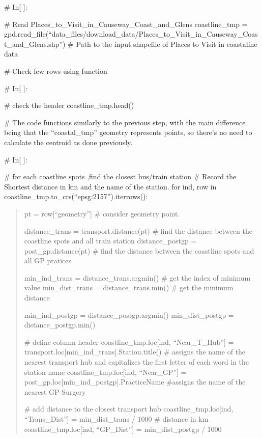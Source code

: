 \documentclass[letterpaper,10pt,english]{sphinxmanual}
\begin{document}
\sphinxAtStartPar
\# In{[} {]}:

\sphinxAtStartPar
\# Read Places\_to\_Visit\_in\_Causeway\_Coast\_and\_Glens
coastline\_tmp = gpd.read\_file(“data\_files/download\_data/Places\_to\_Visit\_in\_Causeway\_Coast\_and\_Glens.shp”) \# Path to the input shapefile of Places to Visit in coastaline data

\sphinxAtStartPar
\# Check few rows using  function

\sphinxAtStartPar
\# In{[} {]}:

\sphinxAtStartPar
\# check the header
coastline\_tmp.head()

\sphinxAtStartPar
\# The code functions similarly to the previous step, with the main difference being that the “coastal\_tmp” geometry represents points, so there’s no need to calculate the centroid as done previously.

\sphinxAtStartPar
\# In{[} {]}:

\sphinxAtStartPar
\# for each coastline spots ,find the closest bus/train station
\# Record the Shortest distance in km and the name of the station.
for ind, row in coastline\_tmp.to\_crs(“epsg:2157”).iterrows():
\begin{quote}

\sphinxAtStartPar
pt = row{[}“geometry”{]} \# consider geometry point.

\sphinxAtStartPar
distance\_trans = transport.distance(pt) \# find the distance between the coastline spots and all train station
distance\_postgp = post\_gp.distance(pt) \# find the distance between the coastline spots and all GP pratices

\sphinxAtStartPar
min\_ind\_trans = distance\_trans.argmin() \# get the index of minimum value
min\_dist\_trans = distance\_trans.min() \# get the minimum distance

\sphinxAtStartPar
min\_ind\_postgp = distance\_postgp.argmin()
min\_dist\_postgp = distance\_postgp.min()

\sphinxAtStartPar
\# define column header
coastline\_tmp.loc{[}ind, “Near\_T\_Hub”{]} = transport.loc{[}min\_ind\_trans{]}.Station.title() \# assigns the name of the nearest transport hub and capitalizes the first letter of each word in the station name
coastline\_tmp.loc{[}ind, “Near\_GP”{]} = post\_gp.loc{[}min\_ind\_postgp{]}.PracticeName \#assigns the name of the nearest GP Surgery

\sphinxAtStartPar
\# add distance to the closest transport hub
coastline\_tmp.loc{[}ind, “Trans\_Dist”{]} = min\_dist\_trans / 1000 \# distance in km
coastline\_tmp.loc{[}ind, “GP\_Dist”{]} = min\_dist\_postgp / 1000
\end{quote}
\end{document}
